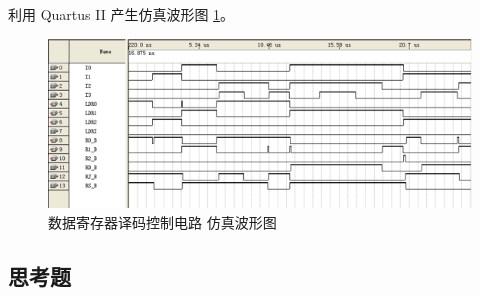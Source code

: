 利用 Quartus II 产生仿真波形图 \ref{fig:wave5_3}。

\begin{figure}[H]
\centering
\includegraphics[width=\textwidth]{images/wave5_3.png}
\caption{数据寄存器译码控制电路 仿真波形图}
\label{fig:wave5_3}
\end{figure}

\subsection{思考题}

